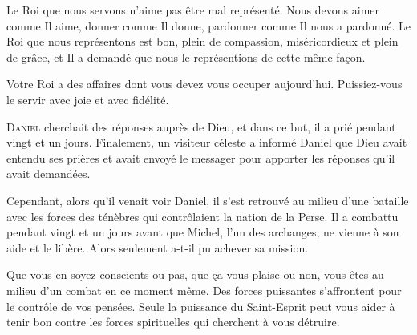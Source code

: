 Le Roi que nous servons n'aime pas être mal représenté.
 Nous devons aimer comme Il aime, donner comme Il donne, pardonner
 comme Il nous a pardonné. Le Roi que nous représentons est bon,
 plein de compassion, miséricordieux et plein de grâce,
 et Il a demandé que nous le représentions de cette même fa\c{c}on. 

Votre Roi a des affaires dont vous devez vous occuper aujourd'hui.
 Puissiez-vous le servir avec joie et avec fidélité. 

\dvrule








\lettrine{D}{aniel} cherchait des réponses auprès de Dieu,
 et dans ce but, il a prié pendant vingt et un jours.
 Finalement, un visiteur céleste a informé Daniel que Dieu avait entendu
 ses prières et avait envoyé le messager pour apporter les réponses
 qu'il avait demandées. 

Cependant, alors qu'il venait voir Daniel, il s'est retrouvé au milieu
 d'une bataille avec les forces des ténèbres qui contrôlaient
 la nation de la Perse. Il a combattu pendant vingt et un jours
 avant que Michel, l'un des archanges, ne vienne à son aide et le libère.
 Alors seulement a-t-il pu achever sa mission. 


Que vous en soyez conscients ou pas, que \c{c}a vous plaise ou non,
 vous êtes au milieu d'un combat en ce moment même.
 Des forces puissantes s'affrontent pour le contrôle de vos pensées.
 Seule la puissance du Saint-Esprit peut vous aider à tenir bon contre
 les forces spirituelles qui cherchent à vous détruire. 

